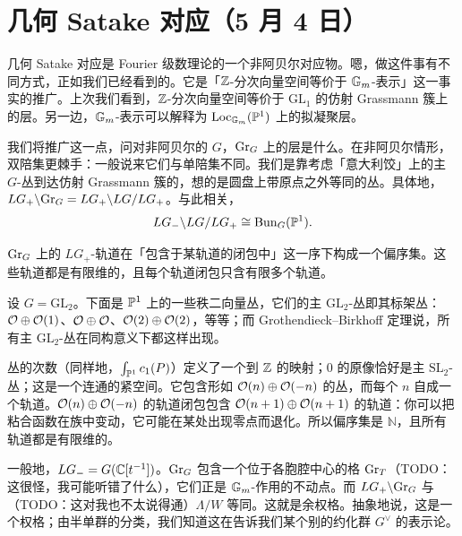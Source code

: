 \section[几何 Satake 对应]{几何 Satake 对应（5 月 4 日）}


几何 Satake 对应是 Fourier 级数理论的一个非阿贝尔对应物。嗯，做这件事有不同方式，正如我们已经看到的。它是「$\Z$-分次向量空间等价于 $\G_m$-表示」这一事实的推广。上次我们看到，$\Z$-分次向量空间等价于 $\mathrm{GL}_1$ 的仿射 Grassmann 簇上的层。另一边，$\G_m$-表示可以解释为 $\mathrm{Loc}_{\G_m}(\P^1)$ 上的拟凝聚层。

我们将推广这一点，问对非阿贝尔的 $G$，$\Gr_G$ 上的层是什么。在非阿贝尔情形，双陪集更棘手：一般说来它们与单陪集不同。我们是靠考虑「意大利饺」上的主 $G$-丛到达仿射 Grassmann 簇的，想的是圆盘上带原点之外等同的丛。具体地，$LG_+\backslash\Gr_G=LG_+\backslash LG/LG_+$。与此相关，
\[
  LG_-\backslash LG/LG_+ \cong \Bun_G(\P^1).
\]

$\Gr_G$ 上的 $LG_+$-轨道在「包含于某轨道的闭包中」这一序下构成一个偏序集。这些轨道都是有限维的，且每个轨道闭包只含有限多个轨道。

\begin{example}
设 $G=\mathrm{GL}_2$。下面是 $\P^1$ 上的一些秩二向量丛，它们的主 $\mathrm{GL}_2$-丛即其标架丛：$\cO\oplus\cO(1)$、$\cO\oplus\cO$、$\cO(2)\oplus\cO(2)$，等等；而 Grothendieck–Birkhoff 定理说，所有主 $\mathrm{GL}_2$-丛在同构意义下都这样出现。

丛的次数（同样地，$\int_{\P^1}c_1(P)$）定义了一个到 $\Z$ 的映射；$0$ 的原像恰好是主 $\mathrm{SL}_2$-丛；这是一个连通的紧空间。它包含形如 $\cO(n)\oplus\cO(-n)$ 的丛，而每个 $n$ 自成一个轨道。$\cO(n)\oplus\cO(-n)$ 的轨道闭包包含 $\cO(n+1)\oplus\cO(n+1)$ 的轨道：你可以把粘合函数在族中变动，它可能在某处出现零点而退化。所以偏序集是 $\mathbb{N}$，且所有轨道都是有限维的。
\end{example}

一般地，$LG_-=G(\C[t^{-1}])$。$\Gr_G$ 包含一个位于各胞腔中心的格 $\Gr_T$（TODO：这很怪，我可能听错了什么），它们正是 $\G_m$-作用的不动点。而 $LG_+\backslash\Gr_G$ 与（TODO：这对我也不太说得通）$\Lambda/W$ 等同。这就是余权格。抽象地说，这是一个权格；由半单群的分类，我们知道这在告诉我们某个别的约化群 $G^\vee$ 的表示论。

